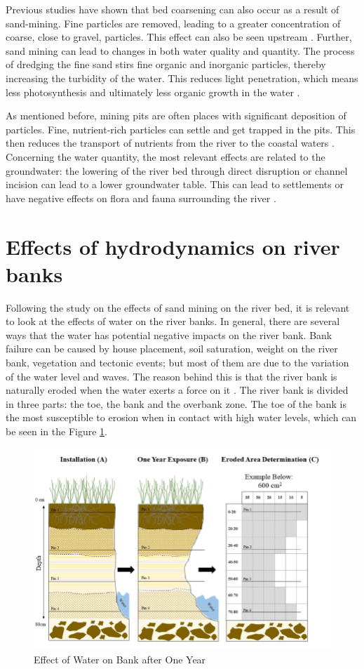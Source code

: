 Previous studies have shown that bed coarsening can also occur as a result of sand-mining. Fine particles are removed, leading to a greater concentration of coarse, close to gravel, particles. This effect can also be seen upstream \autocite{sand-mining-boek}. Further, sand mining can lead to changes in both water quality and quantity. The process of dredging the fine sand stirs fine organic and inorganic particles, thereby increasing the turbidity of the water. This reduces light penetration, which means less photosynthesis and ultimately less organic growth in the water \autocite{sharipEffectsSeasonSand2014}.

As mentioned before, mining pits are often places with significant deposition of particles. Fine, nutrient-rich particles can settle and get trapped in the pits. This then reduces the transport of nutrients from the river to the coastal waters \autocite{sand-mining-boek}. Concerning the water quantity, the most relevant effects are related to the groundwater: the lowering of the river bed through direct disruption or channel incision can lead to a lower groundwater table. This can lead to settlements or have negative effects on flora and fauna surrounding the river \autocite{rentierEnvironmentalImpactsRiver2022}.

\section{Effects of hydrodynamics on river banks}
Following the study on the effects of sand mining on the river bed, it is relevant to look at the effects of water on the river banks. In general, there are several ways that the water has potential negative impacts on the river bank. Bank failure can be caused by house placement, soil saturation, weight on the river bank, vegetation and tectonic events; but most of them are due to the variation of the water level and waves. The reason behind this is that the river bank is naturally eroded when the water exerts a force on it \autocite{governmentofsouthaustraliaRiverbankCollapse2024}.
The river bank is divided in three parts: the toe, the bank and the overbank zone. The toe of the bank is the most susceptible to erosion when in contact with high water levels, which can be seen in the Figure \ref{fig:Effect of Water on Bank after One Year}.

\begin{figure}[H]
    \centering
    \includegraphics[width=0.5\linewidth]{figures/ch2/Erosion.png}
    \caption{Effect of Water on Bank after One Year}
    \label{fig:Effect of Water on Bank after One Year}
\end{figure}

